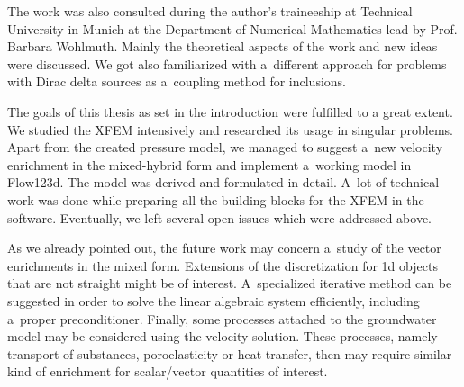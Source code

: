 \documentclass[bibliography=totocnumbered,dvipsnames,FM,Dis, EN]{tulthesis_autoreferat}
\begin{document}
The work was also consulted during the author's traineeship at Technical University in Munich at the Department of Numerical Mathematics
lead by Prof. Barbara Wohlmuth. Mainly the theoretical aspects of the work and new ideas were discussed.
We got also familiarized with a~different approach for problems with Dirac delta sources \cite{koppl_tum_2015, koppl_vidotto_2018}
as a~coupling method for inclusions.


The goals of this thesis as set in the introduction were fulfilled to a great extent.
We studied the XFEM intensively and researched its usage in singular problems.
Apart from the created pressure model, we managed to suggest a~new velocity enrichment in the mixed-hybrid form
and implement a~working model in Flow123d. The model was derived and formulated in detail.
A~lot of technical work was done while preparing all the building blocks for the XFEM in the software.
Eventually, we left several open issues which were addressed above.

As we already pointed out, the future work may concern a~study of the vector enrichments in the mixed form.
Extensions of the discretization for 1d objects that are not straight might be of interest.
A~specialized iterative method can be suggested in order to solve the linear algebraic system efficiently,
including a~proper preconditioner.
Finally, some processes attached to the groundwater model may be considered using the velocity solution.
These processes, namely transport of substances, poroelasticity or heat transfer, then may require
similar kind of enrichment for scalar/vector quantities of interest. 

% 
\newpage
\end{document}
